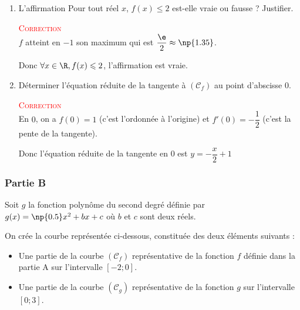 \begin{enumerate}
	\item L'affirmation \og{}Pour tout réel $x$, \mbox{$f(x)\leqslant2$}\fg{} est-elle vraie ou fausse ? Justifier.

	\textcolor{red}{\textsc{Correction}}\\
	$f$ atteint en $-1$ son maximum qui est $\dfrac{\e}{2}\approx\np{1.35}$.

	Donc \mbox{$\forall x\in\R, f(x)\leqslant2$}, l'affirmation est vraie.
	\item Déterminer l'équation réduite de la tangente à \mbox{$(\mathcal{C}_f)$} au point d'abscisse 0.

	\textcolor{red}{\textsc{Correction}}\\
	En $0$, on a $f(0)=1$ (c'est l'ordonnée à l'origine) et $f'(0)=-\dfrac12$ (c'est la pente de la tangente).

	Donc l'équation réduite de la tangente en $0$ est \mbox{$y=-\dfrac x 2 +1$}
\end{enumerate}

\subsubsection*{Partie B}

Soit $g$ la fonction polynôme du second degré définie par \mbox{$g(x)=\np{0.5}x^2+bx+c$} où $b$ et $c$ sont deux réels.

On crée la courbe représentée ci-dessous, constituée des deux éléments suivants :
\begin{itemize}[label=$\bullet$]
	\item Une partie de la courbe \mbox{$(\mathcal{C}_f)$} représentative de la fonction $f$ définie dans la partie A sur l'intervalle \mbox{$[-2;0]$}.



	\item Une partie de la courbe \mbox{$(\mathcal{C}_g)$} représentative de la fonction $g$  sur l'intervalle \mbox{$[0;3]$}.
\end{itemize}

